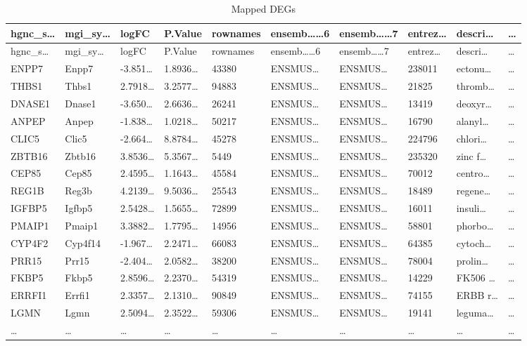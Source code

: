 \documentclass[
]{article}
\begin{document}
\begin{longtable}[]{@{}llllllllll@{}}
\caption{\label{tab:Mapped-DEGs}Mapped DEGs}\tabularnewline
\toprule
hgnc\_s\ldots{} & mgi\_sy\ldots{} & logFC & P.Value & rownames & ensemb\ldots\ldots6 & ensemb\ldots\ldots7 & entrez\ldots{} & descri\ldots{} & \ldots{}\tabularnewline
\midrule
\endfirsthead
\toprule
hgnc\_s\ldots{} & mgi\_sy\ldots{} & logFC & P.Value & rownames & ensemb\ldots\ldots6 & ensemb\ldots\ldots7 & entrez\ldots{} & descri\ldots{} & \ldots{}\tabularnewline
\midrule
\endhead
ENPP7 & Enpp7 & -3.851\ldots{} & 1.8936\ldots{} & 43380 & ENSMUS\ldots{} & ENSMUS\ldots{} & 238011 & ectonu\ldots{} & \ldots{}\tabularnewline
THBS1 & Thbs1 & 2.7918\ldots{} & 3.2577\ldots{} & 94883 & ENSMUS\ldots{} & ENSMUS\ldots{} & 21825 & thromb\ldots{} & \ldots{}\tabularnewline
DNASE1 & Dnase1 & -3.650\ldots{} & 2.6636\ldots{} & 26241 & ENSMUS\ldots{} & ENSMUS\ldots{} & 13419 & deoxyr\ldots{} & \ldots{}\tabularnewline
ANPEP & Anpep & -1.838\ldots{} & 1.0218\ldots{} & 50217 & ENSMUS\ldots{} & ENSMUS\ldots{} & 16790 & alanyl\ldots{} & \ldots{}\tabularnewline
CLIC5 & Clic5 & -2.664\ldots{} & 8.8784\ldots{} & 45278 & ENSMUS\ldots{} & ENSMUS\ldots{} & 224796 & chlori\ldots{} & \ldots{}\tabularnewline
ZBTB16 & Zbtb16 & 3.8536\ldots{} & 5.3567\ldots{} & 5449 & ENSMUS\ldots{} & ENSMUS\ldots{} & 235320 & zinc f\ldots{} & \ldots{}\tabularnewline
CEP85 & Cep85 & 2.4595\ldots{} & 1.1643\ldots{} & 45584 & ENSMUS\ldots{} & ENSMUS\ldots{} & 70012 & centro\ldots{} & \ldots{}\tabularnewline
REG1B & Reg3b & 4.2139\ldots{} & 9.5036\ldots{} & 25543 & ENSMUS\ldots{} & ENSMUS\ldots{} & 18489 & regene\ldots{} & \ldots{}\tabularnewline
IGFBP5 & Igfbp5 & 2.5428\ldots{} & 1.5655\ldots{} & 72899 & ENSMUS\ldots{} & ENSMUS\ldots{} & 16011 & insuli\ldots{} & \ldots{}\tabularnewline
PMAIP1 & Pmaip1 & 3.3882\ldots{} & 1.7795\ldots{} & 14956 & ENSMUS\ldots{} & ENSMUS\ldots{} & 58801 & phorbo\ldots{} & \ldots{}\tabularnewline
CYP4F2 & Cyp4f14 & -1.967\ldots{} & 2.2471\ldots{} & 66083 & ENSMUS\ldots{} & ENSMUS\ldots{} & 64385 & cytoch\ldots{} & \ldots{}\tabularnewline
PRR15 & Prr15 & -2.404\ldots{} & 2.0582\ldots{} & 38200 & ENSMUS\ldots{} & ENSMUS\ldots{} & 78004 & prolin\ldots{} & \ldots{}\tabularnewline
FKBP5 & Fkbp5 & 2.8596\ldots{} & 2.2370\ldots{} & 54319 & ENSMUS\ldots{} & ENSMUS\ldots{} & 14229 & FK506 \ldots{} & \ldots{}\tabularnewline
ERRFI1 & Errfi1 & 2.3357\ldots{} & 2.1310\ldots{} & 90849 & ENSMUS\ldots{} & ENSMUS\ldots{} & 74155 & ERBB r\ldots{} & \ldots{}\tabularnewline
LGMN & Lgmn & 2.5094\ldots{} & 2.3522\ldots{} & 59306 & ENSMUS\ldots{} & ENSMUS\ldots{} & 19141 & leguma\ldots{} & \ldots{}\tabularnewline
\ldots{} & \ldots{} & \ldots{} & \ldots{} & \ldots{} & \ldots{} & \ldots{} & \ldots{} & \ldots{} & \ldots{}\tabularnewline
\bottomrule
\end{longtable}
\end{document}
